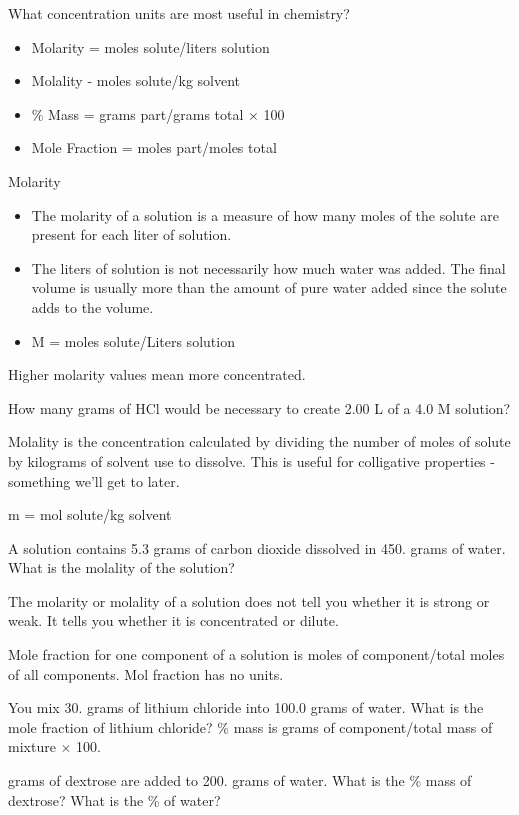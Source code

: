 \documentclass[../hchem.tex]{subfiles}
\begin{document}
What concentration units are most useful in chemistry?
\begin{itemize}
    \item Molarity = moles solute/liters solution 
    \item Molality - moles solute/kg solvent 
    \item \% Mass = grams part/grams total $\times$ 100 
    \item Mole Fraction = moles part/moles total 
\end{itemize}

Molarity 
\begin{itemize}
    \item The molarity of a solution is a measure of how many moles of the solute are present for each liter of solution.
    \item The liters of solution is not necessarily how much water was added. The final volume is usually more than the amount of pure water added since the solute adds to the volume.
    \item M = moles solute/Liters solution 
\end{itemize}

Higher molarity values mean more concentrated.

\ex How many grams of HCl would be necessary to create 2.00 L of a 4.0 M solution?

Molality is the concentration calculated by dividing the number of moles of solute by kilograms of solvent use to dissolve.
This is useful for colligative properties - something we'll get to later.

m = mol solute/kg solvent 

\ex A solution contains 5.3 grams of carbon dioxide dissolved in 450. grams of water. What is the molality of the solution?

The molarity or molality of a solution does not tell you whether it is strong or weak. It tells you whether it is concentrated or dilute.

Mole fraction for one component of a solution is moles of component/total moles of all components. Mol fraction has no units.

\ex You mix 30. grams of lithium chloride into 100.0 grams of water. What is the mole fraction of lithium chloride?
\% mass is grams of component/total mass of mixture $\times$ 100.

 grams of dextrose are added to 200. grams of water. What is the \% mass of dextrose? What is the \% of water?
\end{document}
